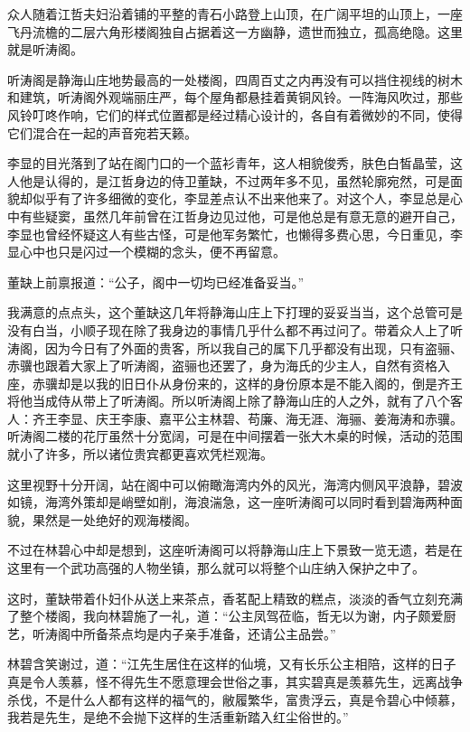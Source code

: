 众人随着江哲夫妇沿着铺的平整的青石小路登上山顶，在广阔平坦的山顶上，一座飞丹流檐的二层六角形楼阁独自占据着这一方幽静，遗世而独立，孤高绝隐。这里就是听涛阁。

听涛阁是静海山庄地势最高的一处楼阁，四周百丈之内再没有可以挡住视线的树木和建筑，听涛阁外观端丽庄严，每个屋角都悬挂着黄铜风铃。一阵海风吹过，那些风铃叮咚作响，它们的样式位置都是经过精心设计的，各自有着微妙的不同，使得它们混合在一起的声音宛若天籁。

李显的目光落到了站在阁门口的一个蓝衫青年，这人相貌俊秀，肤色白皙晶莹，这人他是认得的，是江哲身边的侍卫董缺，不过两年多不见，虽然轮廓宛然，可是面貌却似乎有了许多细微的变化，李显差点认不出来他来了。对这个人，李显总是心中有些疑窦，虽然几年前曾在江哲身边见过他，可是他总是有意无意的避开自己，李显也曾经怀疑这人有些古怪，可是他军务繁忙，也懒得多费心思，今日重见，李显心中也只是闪过一个模糊的念头，便不再留意。

董缺上前禀报道：“公子，阁中一切均已经准备妥当。”

我满意的点点头，这个董缺这几年将静海山庄上下打理的妥妥当当，这个总管可是没有白当，小顺子现在除了我身边的事情几乎什么都不再过问了。带着众人上了听涛阁，因为今日有了外面的贵客，所以我自己的属下几乎都没有出现，只有盗骊、赤骥也跟着大家上了听涛阁，盗骊也还罢了，身为海氏的少主人，自然有资格入座，赤骥却是以我的旧日仆从身份来的，这样的身份原本是不能入阁的，倒是齐王将他当成侍从带上了听涛阁。所以听涛阁上除了静海山庄的人之外，就有了八个客人：齐王李显、庆王李康、嘉平公主林碧、苟廉、海无涯、海骊、姜海涛和赤骥。听涛阁二楼的花厅虽然十分宽阔，可是在中间摆着一张大木桌的时候，活动的范围就小了许多，所以诸位贵宾都更喜欢凭栏观海。

这里视野十分开阔，站在阁中可以俯瞰海湾内外的风光，海湾内侧风平浪静，碧波如镜，海湾外策却是峭壁如削，海浪湍急，这一座听涛阁可以同时看到碧海两种面貌，果然是一处绝好的观海楼阁。

不过在林碧心中却是想到，这座听涛阁可以将静海山庄上下景致一览无遗，若是在这里有一个武功高强的人物坐镇，那么就可以将整个山庄纳入保护之中了。

这时，董缺带着仆妇仆从送上来茶点，香茗配上精致的糕点，淡淡的香气立刻充满了整个楼阁，我向林碧施了一礼，道：“公主凤驾莅临，哲无以为谢，内子颇爱厨艺，听涛阁中所备茶点均是内子亲手准备，还请公主品尝。”

林碧含笑谢过，道：“江先生居住在这样的仙境，又有长乐公主相陪，这样的日子真是令人羡慕，怪不得先生不愿意理会世俗之事，其实碧真是羡慕先生，远离战争杀伐，不是什么人都有这样的福气的，敝履繁华，富贵浮云，真是令碧心中倾慕，我若是先生，是绝不会抛下这样的生活重新踏入红尘俗世的。”

